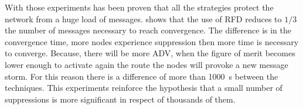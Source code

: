 With those experiments has been proven that all the strategies protect the
network from a huge load of messages.
 shows that the use of \ac{RFD}
reduces to $1/3$ the number of messages necessary to reach convergence.
The difference is in the convergence time, more nodes experience suppression
then more time is necessary to converge.
Because, there will be more \ac{ADV}, when
the figure of merit becomes lower enough to activate again the route the nodes
will provoke a new message storm.
For this reason there is a difference of more than \SI{1000}{\second} between
the techniques.
This experiments reinforce the hypothesis that a small number of suppressions is
more significant in respect of thousands of them.


